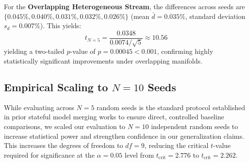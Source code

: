 \documentclass{article}
\theoremstyle{plain}
\theoremstyle{definition}
\theoremstyle{remark}
\begin{document}
For the \textbf{Overlapping Heterogeneous Stream}, the differences across seeds are $\{0.045\%, 0.040\%, 0.031\%, 0.032\%, 0.026\%\}$ (mean $\bar{d} = 0.035\%$, standard deviation $s_d = 0.007\%$). This yields:
\begin{equation}
    t_{N=5} = \frac{0.0348}{0.0074 / \sqrt{5}} \approx 10.56
\end{equation}
yielding a two-tailed $p$-value of $p = 0.00045 < 0.001$, confirming highly statistically significant improvements under overlapping manifolds.

\subsection{Empirical Scaling to $N=10$ Seeds}
While evaluating across $N=5$ random seeds is the standard protocol established in prior stateful model merging works to ensure direct, controlled baseline comparisons, we scaled our evaluation to $N=10$ independent random seeds to increase statistical power and strengthen confidence in our generalization claims. This increases the degrees of freedom to $df=9$, reducing the critical $t$-value required for significance at the $\alpha = 0.05$ level from $t_{\text{crit}} = 2.776$ to $t_{\text{crit}} = 2.262$.
\end{document}
